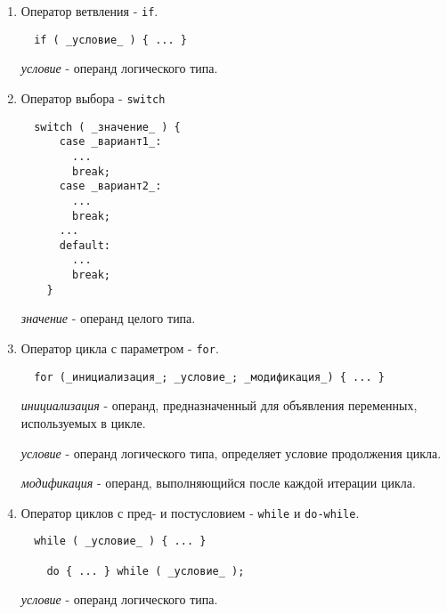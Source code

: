 \begin{enumerate}
\def\labelenumi{\arabic{enumi})}
\item
  Оператор ветвления - \texttt{if}.
\begin{verbatim}
  if ( _условие_ ) { ... }
\end{verbatim}

  \emph{условие} - операнд логического типа.
\item
  Оператор выбора - \texttt{switch}
\begin{verbatim}
  switch ( _значение_ ) {
      case _вариант1_:
        ...
        break;
      case _вариант2_:
        ...
        break;
      ...
      default:
        ...
        break;
    }
\end{verbatim}

  \emph{значение} - операнд целого типа.
\item
  Оператор цикла с параметром - \texttt{for}.
\begin{verbatim}
  for (_инициализация_; _условие_; _модификация_) { ... }
\end{verbatim}

  \emph{инициализация} - операнд, предназначенный для объявления
  переменных, используемых в цикле.

  \emph{условие} - операнд логического типа, определяет условие
  продолжения цикла.

  \emph{модификация} - операнд, выполняющийся после каждой итерации
  цикла.
\item
  Оператор циклов с пред- и постусловием - \texttt{while} и
  \texttt{do-while}.
\begin{verbatim}
  while ( _условие_ ) { ... }

    do { ... } while ( _условие_ );
\end{verbatim}

  \emph{условие} - операнд логического типа.
\end{enumerate}
